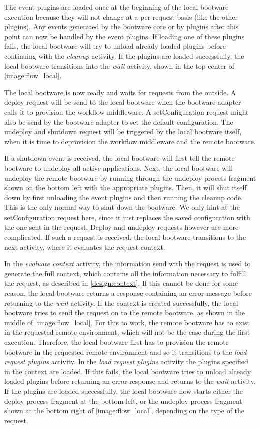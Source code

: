The event plugins are loaded once at the beginning of the local bootware execution because they will not change at a per request basis (like the other plugins).
Any events generated by the bootware core or by plugins after this point can now be handled by the event plugins.
If loading one of these plugins fails, the local bootware will try to unload already loaded plugins before continuing with the \textit{cleanup} activity.
If the plugins are loaded successfully, the local bootware transitions into the \textit{wait} activity, shown in the top center of \autoref{image:flow_local}.

The local bootware is now ready and waits for requests from the outside.
A deploy request will be send to the local bootware when the bootware adapter calls it to provision the workflow middleware.
A setConfiguration request might also be send by the bootware adapter to set the default configuration.
The undeploy and shutdown request will be triggered by the local bootware itself, when it is time to deprovision the workflow middleware and the remote bootware.

If a shutdown event is received, the local bootware will first tell the remote bootware to undeploy all active applications.
Next, the local bootware will undeploy the remote bootware by running through the undeploy process fragment shown on the bottom left with the appropriate plugins.
Then, it will shut itself down by first unloading the event plugins and then running the cleanup code.
This is the only normal way to shut down the bootware.
We only hint at the setConfiguration request here, since it just replaces the saved configuration with the one sent in the request.
Deploy and undeploy requests however are more complicated.
If such a request is received, the local bootware transitions to the next activity, where it evaluates the request context.

In the \textit{evaluate context} activity, the information send with the request is used to generate the full context, which contains all the information necessary to fulfill the request, as described in \autoref{design:context}.
If this cannot be done for some reason, the local bootware returns a response containing an error message before returning to the \textit{wait} activity.
If the context is created successfully, the local bootware tries to send the request on to the remote bootware, as shown in the middle of \autoref{image:flow_local}.
For this to work, the remote bootware has to exist in the requested remote environment, which will not be the case during the first execution.
Therefore, the local bootware first has to provision the remote bootware in the requested remote environment and so it transitions to the \textit{load request plugins} activity.
In the \textit{load request plugins} activity the plugins specified in the context are loaded.
If this fails, the local bootware tries to unload already loaded plugins before returning an error response and returns to the \textit{wait} activity.
If the plugins are loaded successfully, the local bootware now starts either the deploy process fragment at the bottom left, or the undeploy process fragment shown at the bottom right of \autoref{image:flow_local}, depending on the type of the request.

